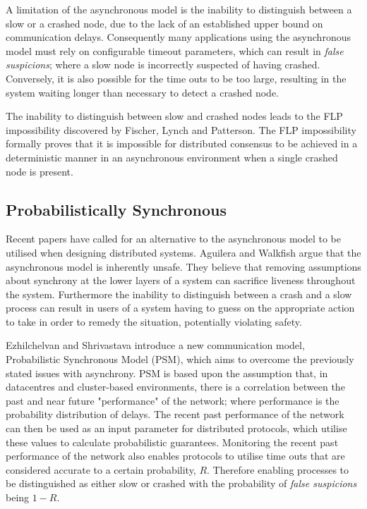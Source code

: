 	A limitation of the asynchronous model is the inability to distinguish between a slow or a crashed node, due to the lack of an established upper bound on communication delays.  Consequently many applications using the asynchronous model must rely on configurable timeout parameters, which can result in \emph{false suspicions}; where a slow node is incorrectly suspected of having crashed.  Conversely, it is also possible for the time outs to be too large, resulting in the system waiting longer than necessary to detect a crashed node.  
	
	The inability to distinguish between slow and crashed nodes leads to the FLP impossibility discovered by Fischer, Lynch and Patterson\citep{Fischer:1985:IDC:3149.214121}.  The FLP impossibility formally proves that it is impossible for distributed consensus to be achieved in a deterministic manner in an asynchronous environment when a single crashed node is present. 
	
	\subsection{Probabilistically Synchronous}\label{ssec:probabilistically_synchronous}
	Recent papers have called for an alternative to the asynchronous model to be utilised when designing distributed systems. Aguilera and Walkfish\citep{Aguilera:2009:NTA:1855568.1855571} argue that the asynchronous model is inherently unsafe. They believe that removing assumptions about synchrony at the lower layers of a system can sacrifice liveness throughout the system. Furthermore the inability to distinguish between a crash and a slow process can result in users of a system having to guess on the appropriate action to take in order to remedy the situation, potentially violating safety. 

Ezhilchelvan and Shrivastava\citep{Ezhilchelvan:2010:LPR:1773912.1773927} introduce a new communication model, Probabilistic Synchronous Model (PSM), which aims to overcome the previously stated issues with asynchrony. PSM is based upon the assumption that, in datacentres and cluster-based environments, there is a correlation between the past and near future "performance" of the network; where performance is the probability distribution of delays.  The recent past performance of the network can then be used as an input parameter for distributed protocols, which utilise these values to calculate probabilistic guarantees. Monitoring the recent past performance of the network also enables protocols to utilise time outs that are considered accurate to a certain probability, $R$.  Therefore enabling processes to be distinguished as either slow or crashed with the probability of \emph{false suspicions} being $1 - R$.  

